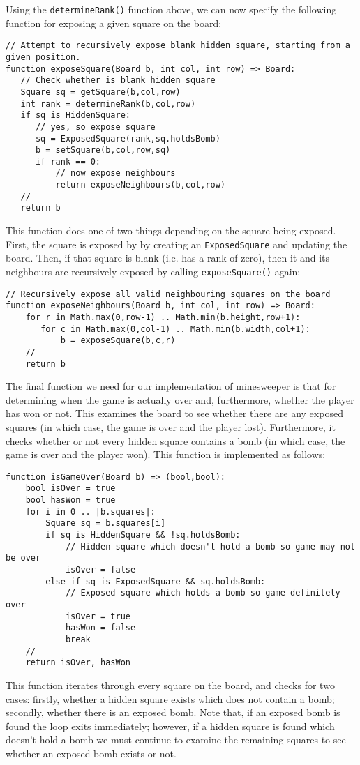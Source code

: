 Using the \lstinline{determineRank()} function above, we can now specify the following function for exposing a given square on the board:

\begin{lstlisting}
// Attempt to recursively expose blank hidden square, starting from a given position.
function exposeSquare(Board b, int col, int row) => Board:
   // Check whether is blank hidden square
   Square sq = getSquare(b,col,row)
   int rank = determineRank(b,col,row)
   if sq is HiddenSquare:       
      // yes, so expose square
      sq = ExposedSquare(rank,sq.holdsBomb)
      b = setSquare(b,col,row,sq)
      if rank == 0:
          // now expose neighbours
          return exposeNeighbours(b,col,row)
   //
   return b
\end{lstlisting}

This function does one of two things depending on the square being exposed.  First, the square is exposed by by creating an \lstinline{ExposedSquare} and updating the board.  Then, if that square is blank (i.e. has a rank of zero), then it and its neighbours are recursively exposed by calling \lstinline{exposeSquare()} again:

\begin{lstlisting}
// Recursively expose all valid neighbouring squares on the board
function exposeNeighbours(Board b, int col, int row) => Board:
    for r in Math.max(0,row-1) .. Math.min(b.height,row+1):
       for c in Math.max(0,col-1) .. Math.min(b.width,col+1):
           b = exposeSquare(b,c,r)
    //
    return b
\end{lstlisting}

The final function we need for our implementation of minesweeper is that for determining when the game is actually over and, furthermore, whether the player has won or not.  This examines the board to see whether there are any exposed squares (in which case, the game is over and the player lost).  Furthermore, it checks whether or not every hidden square contains a bomb (in which case, the game is over and the player won).  This function is implemented as follows:

\begin{lstlisting}
function isGameOver(Board b) => (bool,bool):
    bool isOver = true
    bool hasWon = true
    for i in 0 .. |b.squares|:
        Square sq = b.squares[i]
        if sq is HiddenSquare && !sq.holdsBomb:
            // Hidden square which doesn't hold a bomb so game may not be over
            isOver = false
        else if sq is ExposedSquare && sq.holdsBomb:
            // Exposed square which holds a bomb so game definitely over
            isOver = true
            hasWon = false
            break
    //
    return isOver, hasWon
\end{lstlisting}
This function iterates through every square on the board, and checks for two cases: firstly, whether a hidden square exists which does not contain a bomb; secondly, whether there is an exposed bomb.  Note that, if an exposed bomb is found the loop exits immediately; however, if a hidden square is found which doesn't hold a bomb we must continue to examine the remaining squares to see whether an exposed bomb exists or not.

